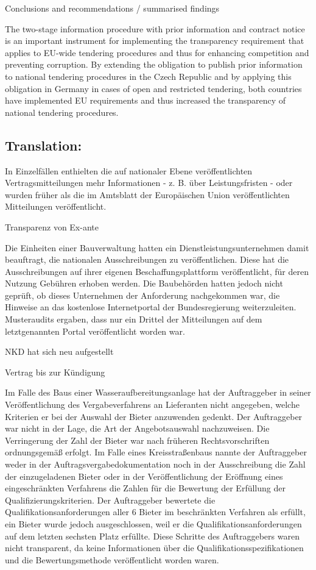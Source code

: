 \documentclass[10pt]{article}
\begin{document}
Conclusions and recommendations / summarised findings

The two-stage information procedure with prior information and contract notice is an important instrument for implementing the transparency requirement that applies to EU-wide tendering procedures and thus for enhancing competition and preventing corruption.
By extending the obligation to publish prior information to national tendering procedures in the Czech Republic and by applying this obligation in Germany in cases of open and restricted tendering, both countries have implemented EU requirements and thus increased the transparency of national tendering procedures.


\pagebreak

\subsection*{Translation:}

In Einzelfällen enthielten die auf nationaler Ebene veröffentlichten Vertragsmitteilungen mehr Informationen - z. B. über Leistungsfristen - oder wurden früher als die im Amtsblatt der Europäischen Union veröffentlichten Mitteilungen veröffentlicht.


Transparenz von Ex-ante

Die Einheiten einer Bauverwaltung hatten ein Dienstleistungsunternehmen damit beauftragt, die nationalen Ausschreibungen zu veröffentlichen.
Diese hat die Ausschreibungen auf ihrer eigenen Beschaffungsplattform veröffentlicht, für deren Nutzung Gebühren erhoben werden.
Die Baubehörden hatten jedoch nicht geprüft, ob dieses Unternehmen der Anforderung nachgekommen war, die Hinweise an das kostenlose Internetportal der Bundesregierung weiterzuleiten.
Musteraudits ergaben, dass nur ein Drittel der Mitteilungen auf dem letztgenannten Portal veröffentlicht worden war.


NKD hat sich neu aufgestellt



Vertrag bis zur Kündigung

Im Falle des Baus einer Wasseraufbereitungsanlage hat der Auftraggeber in seiner Veröffentlichung des Vergabeverfahrens an Lieferanten nicht angegeben, welche Kriterien er bei der Auswahl der Bieter anzuwenden gedenkt.
Der Auftraggeber war nicht in der Lage, die Art der Angebotsauswahl nachzuweisen.
Die Verringerung der Zahl der Bieter war nach früheren Rechtsvorschriften ordnungsgemäß erfolgt.
Im Falle eines Kreisstraßenbaus nannte der Auftraggeber weder in der Auftragsvergabedokumentation noch in der Ausschreibung die Zahl der einzugeladenen Bieter oder in der Veröffentlichung der Eröffnung eines eingeschränkten Verfahrens die Zahlen für die Bewertung der Erfüllung der Qualifizierungskriterien.
Der Auftraggeber bewertete die Qualifikationsanforderungen aller 6 Bieter im beschränkten Verfahren als erfüllt, ein Bieter wurde jedoch ausgeschlossen, weil er die Qualifikationsanforderungen auf dem letzten sechsten Platz erfüllte.
Diese Schritte des Auftraggebers waren nicht transparent, da keine Informationen über die Qualifikationsspezifikationen und die Bewertungsmethode veröffentlicht worden waren.
\end{document}
